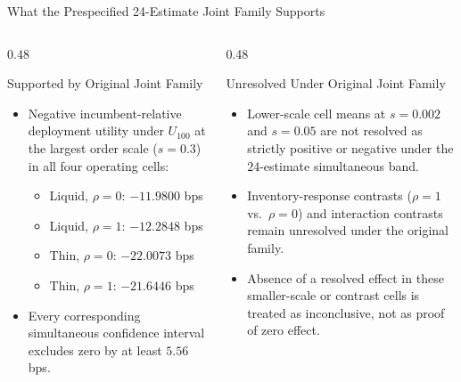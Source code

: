 \documentclass[10pt,aspectratio=169]{beamer}
\begin{document}
\begin{frame}{What the Prespecified 24-Estimate Joint Family Supports}
  \begin{columns}[T]
    \begin{column}{0.48\textwidth}
      \begin{block}{Supported by Original Joint Family}
        \begin{itemize}
          \item Negative incumbent-relative deployment utility under $U_{100}$ at the largest order scale ($s=0.3$) in all four operating cells:
            \begin{itemize}
              \item Liquid, $\rho=0$: $-11.9800$ bps
              \item Liquid, $\rho=1$: $-12.2848$ bps
              \item Thin, $\rho=0$: $-22.0073$ bps
              \item Thin, $\rho=1$: $-21.6446$ bps
            \end{itemize}
          \item Every corresponding simultaneous confidence interval excludes zero by at least $5.56$ bps.
        \end{itemize}
      \end{block}
    \end{column}
    \begin{column}{0.48\textwidth}
      \begin{block}{Unresolved Under Original Joint Family}
        \begin{itemize}
          \item Lower-scale cell means at $s=0.002$ and $s=0.05$ are not resolved as strictly positive or negative under the $24$-estimate simultaneous band.
          \item Inventory-response contrasts ($\rho=1$ vs.\ $\rho=0$) and interaction contrasts remain unresolved under the original family.
          \item Absence of a resolved effect in these smaller-scale or contrast cells is treated as inconclusive, not as proof of zero effect.
        \end{itemize}
      \end{block}
    \end{column}
  \end{columns}
\end{frame}
\end{document}
